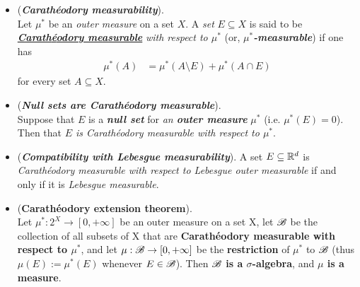 \documentclass[11pt]{article}
\begin{document}
\begin{itemize}
\item \begin{definition} (\emph{\textbf{Carath{\'e}odory measurability}}).\\
Let $\mu^{*}$ be an \emph{outer measure} on a set $X$. A \emph{set} $E \subseteq X$ is said to be \underline{\emph{\textbf{Carath{\'e}odory measurable}}} \emph{with respect to $\mu^{*}$} (or, \emph{\textbf{$\mu^{*}$-measurable}}) if one has
\begin{align*}
\mu^{*}(A) &= \mu^{*}(A \setminus E) + \mu^{*}(A \cap E)
\end{align*} for every set $A \subseteq X$.
\end{definition}

\item \begin{example} (\emph{\textbf{Null sets are Carath{\'e}odory measurable}}). \\
Suppose that $E$ is a \emph{\textbf{null set}} for \emph{an \textbf{outer measure}} $\mu^{*}$  (i.e. $\mu^{*}(E) = 0$).  Then 
that \emph{$E$ is Carath{\'e}odory measurable with respect to $\mu^{*}$}.
\end{example}

\item \begin{example} (\emph{\textbf{Compatibility with Lebesgue measurability}}). 
A set $E \subseteq {\mathbb R}^d$ is \emph{Carath\'eodory measurable with respect to Lebesgue outer measurable} if and only if it is \emph{Lebesgue measurable}.
\end{example}

\item \begin{theorem} (\textbf{Carath\'eodory extension theorem}). \citep{tao2011introduction} \\
Let $\mu^{*}: 2^X \rightarrow [0, +\infty]$ be an outer measure on a set X, let ${\mathscr B}$ be the collection of all subsets of X that are \textbf{Carath\'eodory measurable with respect to $\mu^{*}$}, and let $\mu: {\mathscr B} \rightarrow [0, +\infty]$ be the \textbf{restriction} of $\mu^{*}$ to ${\mathscr B}$ (thus $\mu(E) := \mu^{*}(E)$
whenever $E \in {\mathscr B}$). Then \textbf{${\mathscr B}$ is a $\sigma$-algebra}, and \textbf{$\mu$ is a measure}.
\end{theorem}


\end{itemize}
\end{document}
